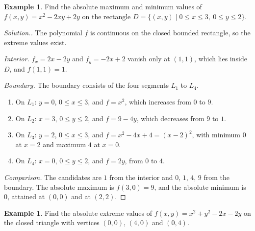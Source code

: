 \documentclass[11pt,a4paper]{article}
\theoremstyle{definition}
\newtheorem{exa}[thm]{Example}
\newenvironment{solution}
  {\renewcommand{\qedsymbol}{}\begin{proof}[\textit{Solution}.]}
  {\end{proof}}
\begin{document}
\begin{exa}
\label{ex:rectangle}
Find the absolute maximum and minimum values of $f(x,y) = x^2 - 2xy + 2y$ on the
rectangle $D = \{(x,y) \mid 0\leq x \leq 3,\ 0 \leq y \leq 2 \}$.
\end{exa}

\begin{solution}
The polynomial $f$ is continuous on the closed bounded rectangle, so the
extreme values exist.

\emph{Interior.} $f_x = 2x -2y$ and $f_y = -2x + 2$ vanish only at $(1,1)$, which
lies inside $D$, and $f(1,1) = 1$.

\emph{Boundary.} The boundary consists of the four segments $L_1$ to $L_4$.

\begin{figure}[H]
\centering
{}
\end{figure}

\begin{enumerate}
\item[$-$] On $L_1$: $y = 0$, $0\leq x\leq 3$, and $f = x^2$, which increases from
$0$ to $9$.
\item[$-$] On $L_2$: $x = 3$, $0\leq y\leq 2$, and $f = 9 - 4y$, which decreases
from $9$ to $1$.
\item[$-$] On $L_3$: $y = 2$, $0\leq x\leq 3$, and $f = x^2 - 4x + 4 = (x-2)^2$,
with minimum $0$ at $x = 2$ and maximum $4$ at $x = 0$.
\item[$-$] On $L_4$: $x = 0$, $0\leq y\leq 2$, and $f = 2y$, from $0$ to $4$.
\end{enumerate}

\emph{Comparison.} The candidates are $1$ from the interior and $0$, $1$, $4$, $9$
from the boundary. The absolute maximum is $f(3,0) = 9$, and the absolute minimum
is $0$, attained at $(0,0)$ and at $(2,2)$.
\end{solution}

\begin{exa}
\label{ex:triangle}
Find the absolute extreme values of $f(x,y) = x^2 + y^2 - 2x - 2y$ on the closed
triangle with vertices $(0,0)$, $(4,0)$ and $(0,4)$.
\end{exa}
\end{document}
